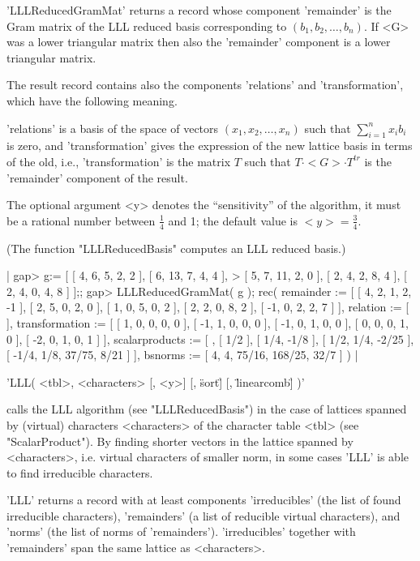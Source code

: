 'LLLReducedGramMat' returns a record whose  component 'remainder' is  the
Gram matrix of the LLL reduced basis corresponding to $(b_1, b_2, \ldots,
b_n)$.  If <G>  was a lower triangular  matrix then also the  'remainder'
component is a lower triangular matrix.

The  result   record   contains also   the  components    'relations' and
'transformation', which have the following meaning.

'relations' is  a basis of  the  space of  vectors $(x_1,x_2,\ldots,x_n)$
such that $\sum_{i=1}^n x_i b_i$ is zero,  and 'transformation' gives the
expression of   the new  lattice   basis  in terms   of   the old,  i.e.,
'transformation' is the  matrix $T$ such that $T  \cdot <G> \cdot T^{tr}$
is the 'remainder' component of the result.

The optional argument  <y> denotes the  ``sensitivity'' of the algorithm,
it must be a  rational number between $\frac{1}{4}$   and 1; the  default
value is $<y> = \frac{3}{4}$.

(The function "LLLReducedBasis" computes an LLL reduced basis.)

|    gap> g:= [ [ 4, 6, 5, 2, 2 ], [ 6, 13, 7, 4, 4 ],
    >    [ 5, 7, 11, 2, 0 ], [ 2, 4, 2, 8, 4 ], [ 2, 4, 0, 4, 8 ] ];;
    gap> LLLReducedGramMat( g );
    rec(
      remainder :=
       [ [ 4, 2, 1, 2, -1 ], [ 2, 5, 0, 2, 0 ], [ 1, 0, 5, 0, 2 ],
          [ 2, 2, 0, 8, 2 ], [ -1, 0, 2, 2, 7 ] ],
      relation := [  ],
      transformation :=
       [ [ 1, 0, 0, 0, 0 ], [ -1, 1, 0, 0, 0 ], [ -1, 0, 1, 0, 0 ],
          [ 0, 0, 0, 1, 0 ], [ -2, 0, 1, 0, 1 ] ],
      scalarproducts := [ , [ 1/2 ], [ 1/4, -1/8 ], [ 1/2, 1/4, -2/25 ],
          [ -1/4, 1/8, 37/75, 8/21 ] ],
      bsnorms := [ 4, 4, 75/16, 168/25, 32/7 ] ) |

%
%
%

'LLL( <tbl>, <characters> [, <y>] [, \"sort\"] [, \"linearcomb\"] )'

calls the LLL  algorithm (see "LLLReducedBasis")  in the case of lattices
spanned by (virtual) characters <characters> of the character table <tbl>
(see "ScalarProduct").  By finding shorter vectors in the lattice spanned
by <characters>, i.e.  virtual characters  of smaller norm, in some cases
'LLL' is able to find irreducible characters.

'LLL' returns a record with  at least components 'irreducibles' (the list
of found  irreducible  characters),  'remainders' (a list    of reducible
virtual characters), and  'norms'  (the list  of norms  of 'remainders').
'irreducibles' together    with 'remainders'  span   the same  lattice as
<characters>.

